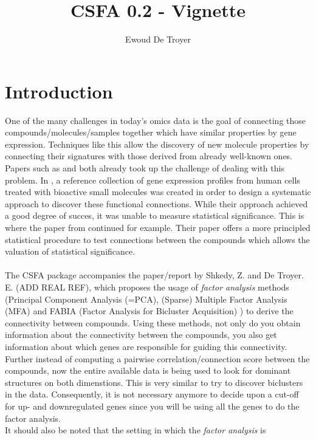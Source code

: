\documentclass[a4paper]{article}\usepackage[]{graphicx}\usepackage[]{color}
\title{CSFA 0.2 - Vignette}
\date{}
\author{Ewoud De Troyer}
\begin{document}
\maketitle
\section{Introduction}

One of the many challenges in today's omics data is the goal of connecting those
compounds/molecules/samples together which have similar properties by gene
expression.
Techniques like this allow the discovery of new molecule properties by
connecting their signatures with those derived from already well-known ones.\\
Papers such as \citet{Lamb2006} and \citet{Zhang2008} both already took up the
challenge of dealing with this problem. In \citet{Lamb2006}, a reference
collection of gene expression profiles from human cells treated with bioactive
small molecules was created in order to design a systematic approach to discover
these functional connections. While their approach achieved a good degree of
succes, it was unable to measure statistical significance. This is where the
paper from \citet{Zhang2008} continued for example. Their paper offers a more
principled statistical procedure to test connections between the compounds which allows the valuation of statistical significance.
\\ \\
The CSFA package accompanies the paper/report by Shkedy, Z. and De Troyer. E. (ADD REAL REF),
which proposes the usage of {\it factor analysis} methods (Principal Component
Analysis (=PCA), (Sparse) Multiple Factor Analysis (MFA) \citep{Abdi2013} and
FABIA (Factor Analysis for Bicluster Acquisition) \citep{Hochreiter2010}) to
derive the connectivity between compounds.
Using these methods, not only do you obtain information about the connectivity between the compounds, you also get
information about which genes are responsible for guiding this connectivity.\\
Further instead of computing a pairwise correlation/connection score between the
compounds, now the entire available data is being used to look for dominant structures on both dimenstions. This is very similar to try to discover biclusters in the data. Consequently, it is not necessary anymore to decide upon a cut-off for up- and downregulated genes since you will be using all the genes to do the factor analysis.
\\
It should also be noted that the setting in which the {\it factor analysis} is
\end{document}

